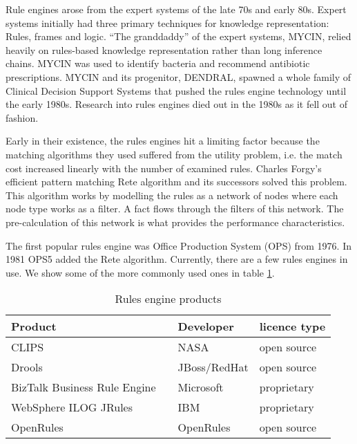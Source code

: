Rule engines arose from the expert systems of the late 70s and early 80s.
Expert systems initially had three primary techniques for knowledge representation: Rules, frames and logic\cite{jackson1986introduction}.
``The granddaddy'' of the expert systems, MYCIN, relied heavily on rules-based knowledge representation\cite{shortliffe1974mycin} rather than long inference chains.
MYCIN was used to identify bacteria and recommend antibiotic prescriptions.
MYCIN and its progenitor, DENDRAL, spawned a whole family of Clinical Decision Support Systems that pushed the rules engine technology until the early 1980s.
Research into rules engines died out in the 1980s as it fell out of fashion.

Early in their existence, the rules engines hit a limiting factor because the matching algorithms they used suffered from the utility problem, i.e. the match cost increased linearly with the number of examined rules.
Charles Forgy's efficient pattern matching Rete algorithm\cite{forgy1989rete} and its successors solved this problem.
This algorithm works by modelling the rules as a network of nodes where each node type works as a filter.
A fact flows through the filters of this network.
The pre-calculation of this network is what provides the performance characteristics.

The first popular rules engine was Office Production System (OPS) from 1976.
In 1981 OPS5 added the Rete algorithm.
Currently, there are a few rules engines in use.
We show some of the more commonly used ones in table \ref{table:RuleEngines}.

\begin{table}
    \begin{center}
        \begin{tabular}{ |l c |l|l| } 
            \hline
            Product                      &                             & Developer    & licence type   \\
            \hline
            CLIPS                        &\cite{CLIPSProductPage}      & NASA         & open source    \\ 
            Drools                       &\cite{DroolsProductPage}     & JBoss/RedHat & open source    \\ 
            BizTalk Business Rule Engine &\cite{BiztalkProductPage}    & Microsoft    & proprietary    \\ 
            WebSphere ILOG JRules        &\cite{JRulesProductPage}     & IBM          & proprietary    \\ 
            OpenRules                    &\cite{OpenRulesProductPage}  & OpenRules    & open source    \\ 
            \hline
        \end{tabular}
    \end{center}
    \caption{Rules engine products}
    \label{table:RuleEngines}
\end{table}






